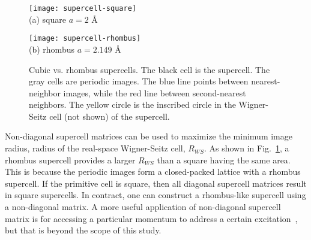 \begin{figure}[h]
\centering
\begin{minipage}{0.49\textwidth}
\centering
\texttt{[image: supercell-square]}\\
(a) square $a=2$ \AA
\end{minipage}
\begin{minipage}{0.49\textwidth}
\centering
\texttt{[image: supercell-rhombus]}\\
(b) rhombus $a=2.149$ \AA
\end{minipage}
\caption{Cubic vs. rhombus supercells. The black cell is the supercell. The gray cells are periodic images. The blue line points between nearest-neighbor images, while the red line between second-nearest neighbors. The yellow circle is the inscribed circle in the Wigner-Seitz cell (not shown) of the supercell.}
\label{fig:hsolid-square-vs-rhombus}
\end{figure}

Non-diagonal supercell matrices can be used to maximize the minimum image radius, radius of the real-space Wigner-Seitz cell, $R_{WS}$.
As shown in Fig.~\ref{fig:hsolid-square-vs-rhombus}, a rhombus supercell provides a larger $R_{WS}$ than a square having the same area.
This is because the periodic images form a closed-packed lattice with a rhombus supercell.
If the primitive cell is square, then all diagonal supercell matrices result in square supercells. In contract, one can construct a rhombus-like supercell using a non-diagonal matrix.
A more useful application of non-diagonal supercell matrix is for accessing a particular momentum to address a certain excitation~\cite{Lloyd-Williams2015}, but that is beyond the scope of this study.

